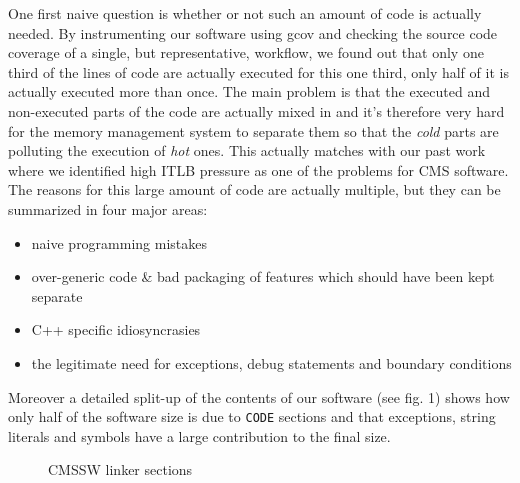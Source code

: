 \documentclass[a4paper]{jpconf}
\begin{document}
One first naive question is whether or not such an amount of code is actually needed. By instrumenting our software using gcov and checking the source code coverage of a single, but representative, workflow, we found out that only one third of the lines of code are actually executed for this one third, only half of it is actually executed more than once. The main problem is that the executed and non-executed parts of the code are actually mixed in and it's therefore very hard for the memory management system to separate them so that the {\itshape cold} parts are polluting the execution of {\itshape hot} ones.
This actually matches with our past work ~\cite{Tuura:2008p00019} where we identified high ITLB pressure as one of the problems for CMS software.
The reasons for this large amount of code are actually multiple, but they can be summarized in four major areas:


\begin{itemize}


\item naive programming mistakes

\item over-generic code \& bad packaging of features which should have been kept separate

\item C++ specific idiosyncrasies

\item the legitimate need for exceptions, debug statements and boundary conditions
\end{itemize}

Moreover a detailed split-up of the contents of our software (see fig. 1) shows how only half of the software size is due to \texttt{CODE} sections and that exceptions, string literals and symbols have a large contribution to the final size.


\begin{figure}
\caption{CMSSW linker sections}
\label{}
\begin{center}
\end{center}
\end{figure}
\end{document}
